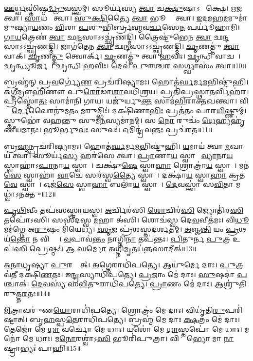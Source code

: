 \ul{𑌊}𑌰𑍍𑌧𑍍𑌵𑌸𑍍𑌤𑌿॑𑌷𑍍𑌠\ul{𑌦𑍍𑌧𑍍𑌰𑍁}𑌵𑌸𑍍𑌤𑍍𑌵𑌮𑍍। 
𑌸𑍂𑌰𑍍𑌯॑𑌸𑍍𑌯 \ul{𑌤𑍍𑌵𑌾} 𑌚\ul{𑌕𑍍𑌷𑍁}𑌷𑌾𑌽𑌨𑍍𑌵𑍀᳚𑌕𑍍𑌷𑍇। 
\ul{𑌋}𑌜𑌵𑍇᳚ 𑌤𑍍𑌵𑌾। 
\ul{𑌸𑌾}𑌧𑌵𑍇᳚ 𑌤𑍍𑌵𑌾। 
\ul{𑌸𑍁}\ul{𑌕𑍍𑌷𑌿}𑌤𑍍𑌯𑍈 \ul{𑌤𑍍𑌵𑌾} 𑌭𑍂𑌤𑍍𑌯𑍈᳚ 𑌤𑍍𑌵𑌾। 
\ul{𑌇}𑌦\ul{𑌮}𑌹\ul{𑌮}𑌮𑍁𑌮𑌾॑\-𑌮𑍁𑌷𑍍𑌯𑌾\ul{𑌯}𑌣𑌂  \ul{𑌵𑌿}𑌶𑌾 \ul{𑌪}𑌶𑍁𑌭𑌿॑𑌰𑍍𑌬𑍍𑌰𑌹𑍍𑌮𑌵\ul{𑌰𑍍𑌚}𑌸𑍇\ul{𑌨} 𑌪𑌰𑍍𑌯𑍂॑𑌹𑌾𑌮𑌿। 
\ul{𑌗𑌾}\ul{𑌯}𑌤𑍍𑌰𑍇𑌣॑ \ul{𑌤𑍍𑌵𑌾} 𑌛\ul{𑌨𑍍𑌦}𑌸𑌾𑌽𑌽𑌚𑍍𑌛𑍃॑𑌣𑌦𑍍𑌮𑌿। 
𑌤𑍍𑌰𑍈𑌷𑍍𑌟𑍁॑𑌭𑍇𑌨 \ul{𑌤𑍍𑌵𑌾} 𑌛\ul{𑌨𑍍𑌦}𑌸𑌾𑌽𑌽𑌚𑍍𑌛𑍃॑𑌣𑌦𑍍𑌮𑌿। 
𑌜𑌾𑌗॑𑌤𑍇𑌨 \ul{𑌤𑍍𑌵𑌾} 𑌛\ul{𑌨𑍍𑌦}𑌸𑌾𑌽𑌽𑌚𑍍𑌛𑍃॑𑌣𑌦𑍍𑌮𑌿। 
\ul{𑌛𑍃}𑌣𑌤𑍍𑌤𑍁॑ \ul{𑌤𑍍𑌵𑌾} 𑌵𑌾𑌕𑍍। 
\ul{𑌛𑍃}𑌣\ul{𑌤𑍍𑌤𑍁} 𑌤𑍍𑌵𑍋𑌰𑍍𑌕𑍍। 
\ul{𑌛𑍃}𑌣𑌤𑍍𑌤𑍁॑ 𑌤𑍍𑌵𑌾 \ul{𑌹}𑌵𑌿𑌃। 
\ul{𑌛𑍃}𑌨𑍍𑌧𑌿 𑌵𑌾𑌚𑌮𑍍᳚। 
\ul{𑌛𑍃}𑌨𑍍𑌧𑍍𑌯𑍂𑌰𑍍𑌜𑌮𑍍᳚। 
\ul{𑌛𑍃}𑌨𑍍𑌧𑌿 \ul{𑌹}𑌵𑌿𑌃। 
𑌦𑍇𑌵॑ 𑌪𑍁𑌰𑌶𑍍𑌚𑌰 \ul{𑌸}𑌗𑍍𑌘𑍍𑌯𑌾𑌸𑌂॑ 𑌤𑍍𑌵𑌾॥10॥
\anuvakamend[\ul{𑌪𑍃}\ul{𑌥𑌿}𑌵𑍀𑌂 𑌭॑\ul{𑌵} 𑌵𑌾𑌖𑍍𑌷𑌟𑍍𑌚॑]

𑌬𑍍𑌰𑌹𑍍𑌮॑𑌨𑍍 𑌪𑍍𑌰\ul{𑌵}𑌰𑍍𑌗𑍍𑌯𑍇॑\ul{𑌣} 𑌪𑍍𑌰𑌚॑𑌰𑌿𑌷𑍍𑌯𑌾𑌮𑌃। 
𑌹𑍋𑌤॑\ul{𑌰𑍍𑌘}𑌰𑍍𑌮\ul{𑌮}𑌭𑌿𑌷𑍍𑌟𑍁॑𑌹𑌿। 
𑌅\ul{𑌗𑍍𑌨𑍀}𑌦𑍍𑌰𑍗𑌹𑌿॑𑌣𑍗 𑌪𑍁\ul{𑌰𑍋}𑌡𑌾\ul{𑌶𑌾}𑌵𑌧𑌿॑𑌶𑍍𑌰𑌯। 
𑌪𑍍𑌰𑌤𑌿॑𑌪𑍍𑌰𑌸𑍍𑌥𑌾\ul{𑌤}𑌰𑍍𑌵𑌿𑌹॑𑌰। 
𑌪𑍍𑌰𑌸𑍍𑌤𑍋॑\ul{𑌤𑌃} 𑌸𑌾𑌮𑌾॑𑌨𑌿 𑌗𑌾𑌯। 
𑌯𑌜𑍁॑𑌰𑍍\mbox{}𑌯𑍁\ul{𑌕𑍍𑌤}\ul{} 𑌸𑌾𑌮॑\ul{𑌭𑌿}𑌰𑌾𑌕𑍍𑌤॑𑌖𑌨𑍍𑌤𑍍𑌵𑌾। 
𑌵𑌿𑌶𑍍𑌵𑍈᳚\ul{𑌰𑍍𑌦𑍇}𑌵𑍈𑌰𑌨𑍁॑𑌮𑌤𑌂 \ul{𑌮}𑌰𑍁𑌦𑍍𑌭𑌿𑌃॑। 
𑌦𑌕𑍍𑌷𑌿॑𑌣𑌾\ul{𑌭𑌿𑌃} 𑌪𑍍𑌰𑌤॑𑌤𑌂 𑌪𑌾𑌰\ul{𑌯𑌿}𑌷𑍍𑌣𑍁𑌮𑍍। 
𑌸𑍍𑌤𑍁𑌭𑍋॑ 𑌵𑌹𑌨𑍍𑌤𑍁 𑌸𑍁𑌮\ul{𑌨}𑌸𑍍𑌯𑌮𑌾॑𑌨𑌮𑍍। 
𑌸 \ul{𑌨𑍋} 𑌰𑍁𑌚𑌂॑ \ul{𑌧𑍇}𑌹𑍍𑌯𑌹𑍃॑𑌣𑍀𑌯𑌮𑌾𑌨𑌃। 
𑌭𑍂𑌰𑍍𑌭𑍁\ul{𑌵𑌃} 𑌸𑍁𑌵𑌃॑। 
𑌓𑌮𑌿𑌨𑍍𑌦𑍍𑌰॑𑌵\ul{𑌨𑍍𑌤𑌃} 𑌪𑍍𑌰𑌚॑𑌰𑌤॥11॥
\anuvakamend[𑌅𑌹𑍃॑𑌣𑍀𑌯𑌮𑌾\ul{𑌨𑍋} 𑌦𑍍𑌵𑍇 𑌚॑]

𑌬𑍍𑌰\ul{𑌹𑍍𑌮}𑌨𑍍𑌪𑍍𑌰𑌚॑𑌰𑌿𑌷𑍍𑌯𑌾𑌮𑌃। 
𑌹𑍋𑌤॑\ul{𑌰𑍍𑌘}𑌰𑍍𑌮\ul{𑌮}𑌭𑌿𑌷𑍍𑌟𑍁॑𑌹𑌿। 
\ul{𑌯}𑌮𑌾𑌯॑ 𑌤𑍍𑌵𑌾 \ul{𑌮}𑌖𑌾𑌯॑ 𑌤𑍍𑌵𑌾। 
𑌸𑍂𑌰𑍍𑌯॑\ul{𑌸𑍍𑌯} 𑌹𑌰॑𑌸𑍇 𑌤𑍍𑌵𑌾। 
\ul{𑌪𑍍𑌰𑌾}𑌣𑌾\ul{𑌯} 𑌸𑍍𑌵𑌾𑌹𑌾᳚ \ul{𑌵𑍍𑌯𑌾}𑌨𑌾\ul{𑌯} 𑌸𑍍𑌵𑌾𑌹𑌾॑𑌽\ul{𑌪𑌾}𑌨𑌾\ul{𑌯} 𑌸𑍍𑌵𑌾𑌹𑌾᳚। 
𑌚𑌕𑍍𑌷𑍁॑\ul{𑌷𑍇} 𑌸𑍍𑌵𑌾\ul{𑌹𑌾} 𑌶𑍍𑌰𑍋𑌤𑍍𑌰𑌾॑\ul{𑌯} 𑌸𑍍𑌵𑌾𑌹𑌾᳚। 
𑌮𑌨॑\ul{𑌸𑍇} 𑌸𑍍𑌵𑌾𑌹𑌾॑ \ul{𑌵𑌾}𑌚𑍇 𑌸𑌰॑𑌸𑍍𑌵\ul{𑌤𑍍𑌯𑍈} 𑌸𑍍𑌵𑌾𑌹𑌾᳚। 
𑌦𑌕𑍍𑌷𑌾॑\ul{𑌯} 𑌸𑍍𑌵𑌾\ul{𑌹𑌾} 𑌕𑍍𑌰𑌤॑\ul{𑌵𑍇} 𑌸𑍍𑌵𑌾𑌹𑌾᳚। 
𑌓𑌜॑\ul{𑌸𑍇} 𑌸𑍍𑌵𑌾\ul{𑌹𑌾} 𑌬𑌲𑌾॑\ul{𑌯} 𑌸𑍍𑌵𑌾𑌹𑌾᳚। 
\ul{𑌦𑍇}𑌵𑌸𑍍𑌤𑍍𑌵𑌾॑ 𑌸\ul{𑌵𑌿}𑌤𑌾 𑌮𑌧𑍍𑌵𑌾॑𑌽𑌨𑌕𑍍𑌤𑍁॥12॥

\ul{𑌪𑍃}\ul{𑌥𑌿}𑌵𑍀𑌂 𑌤𑌪॑𑌸𑌸𑍍𑌤𑍍𑌰𑌾𑌯𑌸𑍍𑌵। 
\ul{𑌅}𑌰𑍍𑌚𑌿𑌰॑𑌸𑌿 \ul{𑌶𑍋}𑌚𑌿𑌰॑\ul{𑌸𑌿} 𑌜𑍍𑌯𑍋𑌤𑌿॑𑌰\ul{𑌸𑌿} 𑌤𑌪𑍋॑𑌽𑌸𑌿। 
𑌸𑌸𑍀॑𑌦𑌸𑍍𑌵 \ul{𑌮}𑌹𑌾 𑌅॑𑌸𑌿। 
𑌶𑍋𑌚॑𑌸𑍍𑌵 𑌦𑍇\ul{𑌵}𑌵𑍀𑌤॑𑌮𑌃। 
𑌵𑌿\ul{𑌧𑍂}𑌮𑌮॑𑌗𑍍𑌨𑍇 𑌅\ul{𑌰𑍁}𑌷𑌂 𑌮𑌿॑𑌯𑍇𑌧𑍍𑌯। 
\ul{𑌸𑍃}𑌜 𑌪𑍍𑌰॑𑌶𑌸𑍍𑌤𑌦𑌰𑍍\mbox{}\ul{𑌶}𑌤𑌮𑍍। 
\ul{𑌅}𑌞𑍍𑌜\ul{𑌨𑍍𑌤𑌿} 𑌯𑌂 \ul{𑌪𑍍𑌰}𑌥𑌯॑\ul{𑌨𑍍𑌤𑍋} 𑌨 𑌵𑌿𑌪𑍍𑌰𑌾𑌃᳚। 
\ul{𑌵}𑌪𑌾𑌵॑\ul{𑌨𑍍𑌤𑌂} 𑌨𑌾𑌗𑍍𑌨𑌿\ul{𑌨𑌾} 𑌤𑌪॑𑌨𑍍𑌤𑌃। 
\ul{𑌪𑌿}𑌤𑍁𑌰𑍍𑌨 \ul{𑌪𑍁}𑌤𑍍𑌰 𑌉𑌪॑\ul{𑌸𑌿} 𑌪𑍍𑌰𑍇𑌷𑍍𑌠𑌃॑। 
𑌆 \ul{𑌘}𑌰𑍍𑌮𑍋 \ul{𑌅}𑌗𑍍𑌨𑌿\ul{𑌮𑍃}𑌤𑌯॑𑌨𑍍𑌨𑌸𑌾𑌦𑍀𑌤𑍍॥13॥

\ul{𑌅}\ul{𑌨𑌾}\ul{𑌧𑍃}𑌷𑍍𑌯𑌾 \ul{𑌪𑍁}𑌰𑌸𑍍𑌤𑌾᳚𑌤𑍍। 
\ul{𑌅}𑌗𑍍𑌨𑍇𑌰𑌾𑌧𑌿॑𑌪𑌤𑍍𑌯𑍇। 
𑌆𑌯𑍁॑𑌰𑍍𑌮𑍇 𑌦𑌾𑌃। 
\ul{𑌪𑍁}𑌤𑍍𑌰𑌵॑𑌤𑍀 𑌦𑌕𑍍𑌷𑌿\ul{𑌣}𑌤𑌃। 
𑌇\ul{𑌨𑍍𑌦𑍍𑌰}𑌸𑍍𑌯𑌾𑌧𑌿॑𑌪𑌤𑍍𑌯𑍇। 
\ul{𑌪𑍍𑌰}𑌜𑌾𑌂 𑌮𑍇॑ 𑌦𑌾𑌃। 
\ul{𑌸𑍁}𑌷𑌦𑌾॑ \ul{𑌪}𑌶𑍍𑌚𑌾𑌤𑍍। 
\ul{𑌦𑍇}𑌵𑌸𑍍𑌯॑ 𑌸\ul{𑌵𑌿}𑌤𑍁𑌰𑌾𑌧𑌿॑𑌪𑌤𑍍𑌯𑍇। 
\ul{𑌪𑍍𑌰𑌾}𑌣𑌂 𑌮𑍇॑ 𑌦𑌾𑌃। 
𑌆𑌶𑍍𑌰𑍁॑𑌤𑌿𑌰𑍁𑌤𑍍𑌤\ul{𑌰}𑌤𑌃॥14॥

\ul{𑌮𑌿}𑌤𑍍𑌰𑌾𑌵𑌰𑍁॑𑌣\ul{𑌯𑍋}𑌰𑌾𑌧𑌿॑𑌪𑌤𑍍𑌯𑍇। 
𑌶𑍍𑌰𑍋𑌤𑍍𑌰𑌂॑ 𑌮𑍇 𑌦𑌾𑌃। 
𑌵𑌿𑌧𑍃॑𑌤𑌿\ul{𑌰𑍁}𑌪𑌰𑌿॑𑌷𑍍𑌟𑌾𑌤𑍍। 
𑌬𑍃\ul{𑌹}𑌸𑍍𑌪\ul{𑌤𑍇}𑌰𑌾𑌧𑌿॑𑌪𑌤𑍍𑌯𑍇। 
𑌬𑍍𑌰𑌹𑍍𑌮॑ 𑌮𑍇 𑌦𑌾𑌃 \ul{𑌕𑍍𑌷}𑌤𑍍𑌰𑌂 𑌮𑍇॑ 𑌦𑌾𑌃। 
𑌤𑍇𑌜𑍋॑ 𑌮𑍇 \ul{𑌧𑌾} 𑌵𑌰𑍍𑌚𑍋॑ 𑌮𑍇 𑌧𑌾𑌃। 
𑌯𑌶𑍋॑ 𑌮𑍇 \ul{𑌧𑌾}𑌸𑍍𑌤𑌪𑍋॑ 𑌮𑍇 𑌧𑌾𑌃। 
𑌮𑌨𑍋॑ 𑌮𑍇 𑌧𑌾𑌃। 
𑌮\ul{𑌨𑍋}𑌰𑌶𑍍𑌵𑌾॑𑌽\ul{𑌸𑌿} 𑌭𑍂𑌰𑌿॑𑌪𑍁𑌤𑍍𑌰𑌾। 
𑌵𑌿𑌶𑍍𑌵𑌾᳚𑌭𑍍𑌯𑍋 𑌮𑌾 \ul{𑌨𑌾}𑌷𑍍𑌟𑍍𑌰𑌾𑌭𑍍𑌯𑌃॑ 𑌪𑌾𑌹𑌿॥15॥

